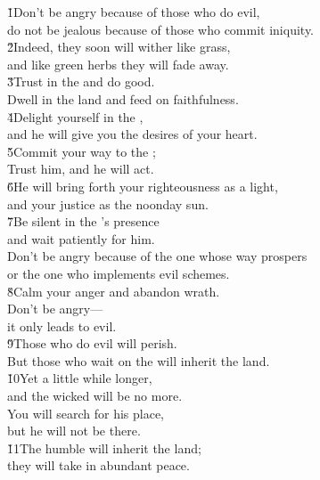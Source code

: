 \begin{poetry}
\poeml \v{1}Don't be angry because of those who do evil, \\
\poemll    do not be jealous because of those who commit iniquity. \\
\poeml \v{2}Indeed, they soon will wither like grass, \\
\poemll    and like green herbs they will fade away. \\
\poeml \v{3}Trust in the  and do good. \\
\poemll    Dwell in the land and feed on faithfulness. \\
\poeml \v{4}Delight yourself in the , \\
\poemll    and he will give you the desires of your heart. \\
\poeml \v{5}Commit your way to the ; \\
\poemll    Trust him, and he will act. \\
\poeml \v{6}He will bring forth your righteousness as a light, \\
\poemll    and your justice as the noonday sun. \\
\poeml \v{7}Be silent in the 's presence \\
\poemll    and wait patiently for him. \\
\poeml Don't be angry because of the one whose way prospers \\
\poemll    or the one who implements evil schemes. \\
\poeml \v{8}Calm your anger and abandon wrath. \\
\poemll    Don't be angry--- \\
\poemlll       it only leads to evil. \\
\poeml \v{9}Those who do evil will perish. \\
\poemll    But those who wait on the  will inherit the land. \\
\poeml \v{10}Yet a little while longer, \\
\poemll    and the wicked will be no more. \\
\poeml You will search for his place, \\
\poemll    but he will not be there. \\
\poeml \v{11}The humble will inherit the land; \\
\poemll    they will take in abundant peace. \\

\end{poetry}
